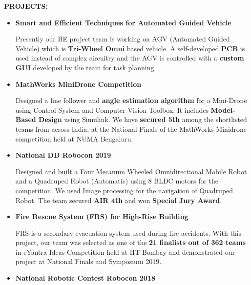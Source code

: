 \documentclass[a4paper, 10pt]{article}
\begin{document}
{\textbf{\Large{PROJECTS:}}}
\begin{itemize}
\item {\textbf{\large{Smart and Efficient Techniques for Automated Guided Vehicle}}}

Presently our BE project team is working on AGV (Automated Guided Vehicle) which is \textbf{Tri-Wheel Omni} based vehicle$.$ A self-developed \textbf{PCB} is used instead of complex circuitry and the AGV is controlled with a \textbf{custom GUI} developed by the team for task planning$.$ %

\item {\textbf{\large{MathWorks MiniDrone Competition}}}

Designed a line follower and \textbf{angle estimation algorithm} for a Mini-Drone using Control System and Computer Vision Toolbox. It includes \textbf{Model-Based Design} using Simulink. We have \textbf{secured 5th} among the shortlisted teams from across India, at the National Finals of the MathWorks Minidrone competition held at NUMA Bengaluru.

\item {\textbf{\large{National DD Robocon 2019}}}

Designed and built a Four Mecanum Wheeled Omnidirectional Mobile Robot and a Quadruped Robot (Automatic) using 8 BLDC motors for the competition$.$ We used Image processing for the navigation of Quadruped Robot$.$ The team secured \textbf{AIR 4th} and won \textbf{Special Jury Award}.

\item {\textbf{\large{Fire Rescue System (FRS) for High-Rise Building}}}

FRS is a secondary evacuation system used during fire accidents$.$ With this project, our team was selected as one of the \textbf{21 finalists out of 362 teams} in eYantra Ideas Competition held at IIT Bombay and demonstrated our project at National Finals and Symposium 2019.



\item {\textbf{\large{National Robotic Contest Robocon 2018}}}


\end{itemize}
\end{document}
